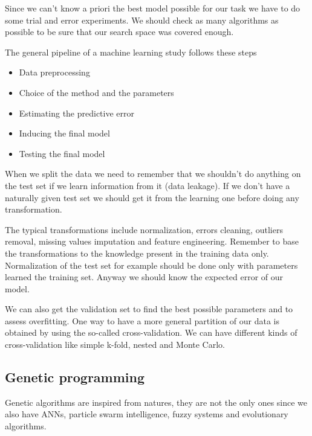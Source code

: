 Since we can't know a priori the best model possible for our task we have to do some trial and error experiments. We should check as many algorithms as possible to be sure that our search space was covered enough. 

\vspace{10pt}

The general pipeline of a machine learning study follows these steps 
\begin{itemize}
    \item Data preprocessing
    \item Choice of the method and the parameters
    \item Estimating the predictive error
    \item Inducing the final model
    \item Testing the final model
\end{itemize}

When we split the data we need to remember that we shouldn't do anything on the test set if we learn information from it (data leakage). If we don't have a naturally given test set we should get it from the learning one before doing any transformation. 

The typical transformations include normalization, errors cleaning, outliers removal, missing values imputation and feature engineering. Remember to base the transformations to the knowledge present in the training data only. Normalization of the test set for example should be done only with parameters learned the training set. Anyway we should know the expected error of our model. 

\vspace{10pt}

We can also get the validation set to find the best possible parameters and to assess overfitting. One way to have a more general partition of our data is obtained by using the so-called cross-validation. We can have different kinds of cross-validation like simple k-fold, nested and Monte Carlo.

\subsection{Genetic programming}

Genetic algorithms are inspired from natures, they are not the only ones since we also have ANNs, particle swarm intelligence, fuzzy systems and evolutionary algorithms.

\vspace{10pt}

